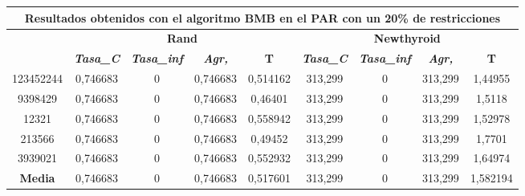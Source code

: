 \documentclass[12pt, spanish]{article}
\begin{document}
\begin{table}[H]
\begin{tabular}{|c|c|c|c|c|c|c|c|c|}
\hline
\multicolumn{9}{|c|}{\textbf{Resultados obtenidos con el algoritmo BMB en el PAR con un 20\% de restricciones}}                                                                                                   \\ \hline
\multirow{2}{*}{} & \multicolumn{4}{c|}{\textbf{Rand}}                                                            & \multicolumn{4}{c|}{\textbf{Newthyroid}}                                                      \\ \cline{2-9} 
                  & \textit{\textbf{Tasa\_C}} & \textit{\textbf{Tasa\_inf}} & \textit{\textbf{Agr,}} & \textbf{T} & \textit{\textbf{Tasa\_C}} & \textit{\textbf{Tasa\_inf}} & \textit{\textbf{Agr,}} & \textbf{T} \\ \hline
123452244         & 0,746683                  & 0                           & 0,746683               & 0,514162   & 313,299                   & 0                           & 313,299                & 1,44955    \\ \hline
9398429           & 0,746683                  & 0                           & 0,746683               & 0,46401    & 313,299                   & 0                           & 313,299                & 1,5118     \\ \hline
12321             & 0,746683                  & 0                           & 0,746683               & 0,558942   & 313,299                   & 0                           & 313,299                & 1,52978    \\ \hline
213566            & 0,746683                  & 0                           & 0,746683               & 0,49452    & 313,299                   & 0                           & 313,299                & 1,7701     \\ \hline
3939021           & 0,746683                  & 0                           & 0,746683               & 0,552932   & 313,299                   & 0                           & 313,299                & 1,64974    \\ \hline
\textbf{Media}    & 0,746683                  & 0                           & 0,746683               & 0,517601   & 313,299                   & 0                           & 313,299                & 1,582194   \\ \hline
\end{tabular}
\end{table}
\end{document}
